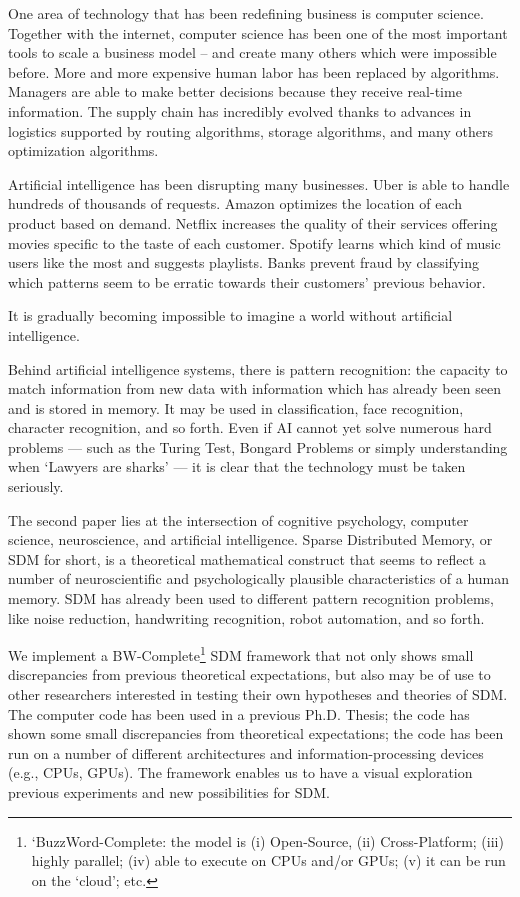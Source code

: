 One area of technology that has been redefining business is computer science. Together with the internet, computer science has been one of the most important tools to scale a business model -- and create many others which were impossible before. More and more expensive human labor has been replaced by algorithms. Managers are able to make better decisions because they receive real-time information. The supply chain has incredibly evolved thanks to advances in logistics supported by routing algorithms, storage algorithms, and many others optimization algorithms.

Artificial intelligence has been disrupting many businesses. Uber is able to handle hundreds of thousands of requests. Amazon optimizes the location of each product based on demand. Netflix increases the quality of their services offering movies specific to the taste of each customer. Spotify learns which kind of music users like the most and suggests playlists. Banks prevent fraud by classifying which patterns seem to be erratic towards their customers' previous behavior.

It is gradually becoming impossible to imagine a world without artificial intelligence.

Behind artificial intelligence systems, there is pattern recognition: the capacity to match information from new data with information which has already been seen and is stored in memory. It may be used in classification, face recognition, character recognition, and so forth.  Even if AI cannot yet solve numerous hard problems --- such as the Turing Test, Bongard Problems or simply understanding when `Lawyers are sharks' \citep{french1990subcognition, french2000turing, linhares2000glimpse, french2001co} --- it is clear that the technology must be taken seriously.

The second paper lies at the intersection of cognitive psychology, computer science, neuroscience, and artificial intelligence.  Sparse Distributed Memory, or SDM for short, is a theoretical mathematical construct that seems to reflect a number of neuroscientific and psychologically plausible characteristics of a human memory. SDM has already been used to different pattern recognition problems, like noise reduction, handwriting recognition, robot automation, and so forth.

We implement a BW-Complete\footnote{`BuzzWord-Complete: the model is (i) Open-Source, (ii) Cross-Platform; (iii) highly parallel; (iv) able to execute on CPUs and/or GPUs; (v) it can be run on the `cloud'; etc.} SDM framework that not only shows small discrepancies from previous theoretical expectations, but also may be of use to other researchers interested in testing their own hypotheses and theories of SDM. The computer code has been used in a previous Ph.D. Thesis; the code has shown some small discrepancies from theoretical expectations; the code has been run on a number of different architectures and information-processing devices (e.g., CPUs, GPUs).  The framework enables us to have a visual exploration previous experiments and new possibilities for SDM.

